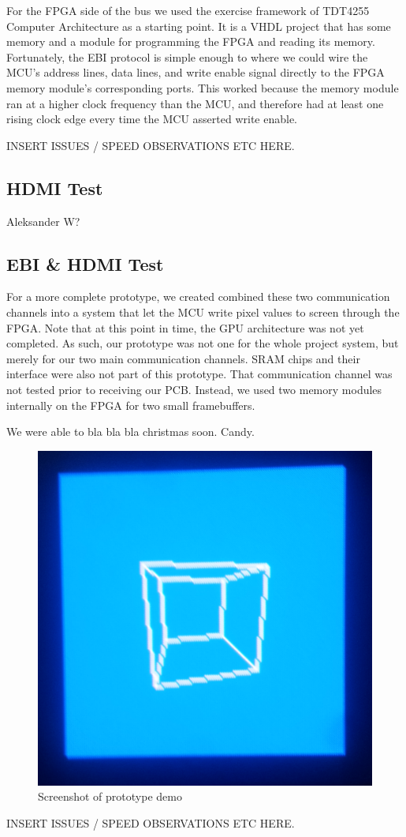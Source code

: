 For the FPGA side of the bus we used the exercise framework of TDT4255 Computer Architecture as a starting point.
It is a VHDL project that has some memory and a module for programming the FPGA and reading its memory.
Fortunately, the EBI protocol is simple enough to where we could wire the MCU's address lines, data lines, and write enable signal directly to the FPGA memory module's corresponding ports.
This worked because the memory module ran at a higher clock frequency than the MCU, and therefore had at least one rising clock edge every time the MCU asserted write enable.

INSERT ISSUES / SPEED OBSERVATIONS ETC HERE.

\subsection{HDMI Test}
Aleksander W?

\subsection{EBI & HDMI Test}
For a more complete prototype, we created combined these two communication channels into a system that let the MCU write pixel values to screen through the FPGA.
Note that at this point in time, the GPU architecture was not yet completed.
As such, our prototype was not one for the whole project system, but merely for our two main communication channels.
SRAM chips and their interface were also not part of this prototype.
That communication channel was not tested prior to receiving our PCB.
Instead, we used two memory modules internally on the FPGA for two small framebuffers.

We were able to bla bla bla christmas soon.
Candy.

\begin{figure}[htp]
\centering
\includegraphics[scale=1.00]{diagrams/prototype_demo.png}
\caption{Screenshot of prototype demo}
\label{prototype_demo}
\end{figure}

INSERT ISSUES / SPEED OBSERVATIONS ETC HERE.